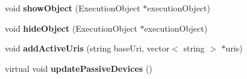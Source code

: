 \begin{CompactItemize}
\item 
void \textbf{showObject} (ExecutionObject $\ast$executionObject)\label{classbr_1_1pucrio_1_1telemidia_1_1ginga_1_1ncl_1_1multidevice_1_1FormatterMultiDevice_a5a334db28025d697079f93af3f4fcfe}

\item 
void \textbf{hideObject} (ExecutionObject $\ast$executionObject)\label{classbr_1_1pucrio_1_1telemidia_1_1ginga_1_1ncl_1_1multidevice_1_1FormatterMultiDevice_6c9e454ac11fc5e4f4749b7a4768f903}

\item 
void \textbf{addActiveUris} (string baseUri, vector$<$ string $>$ $\ast$uris)\label{classbr_1_1pucrio_1_1telemidia_1_1ginga_1_1ncl_1_1multidevice_1_1FormatterMultiDevice_020013dc497c0894f0600f4892dedd4d}

\item 
virtual void \textbf{updatePassiveDevices} ()\label{classbr_1_1pucrio_1_1telemidia_1_1ginga_1_1ncl_1_1multidevice_1_1FormatterMultiDevice_00675154e453a4ceb9ef7df628d398ca}

\end{CompactItemize}

